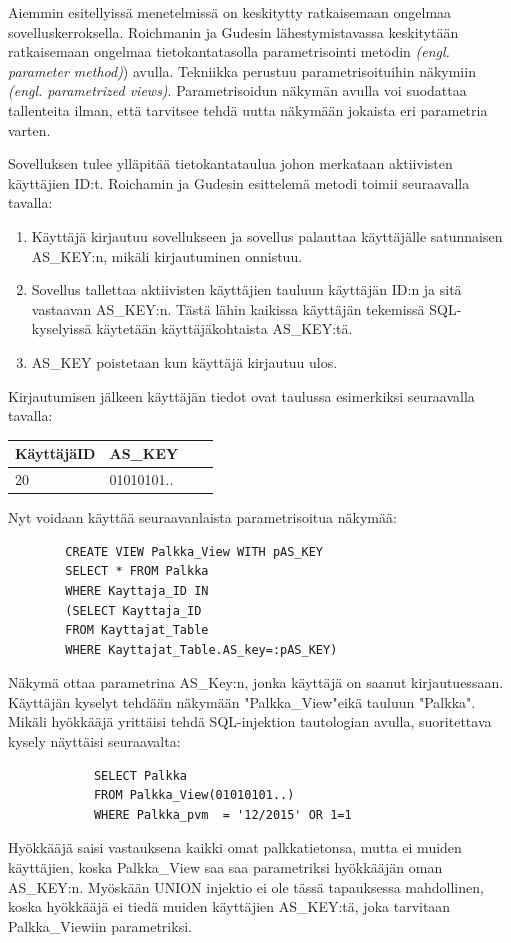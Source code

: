 \documentclass[finnish]{tktltiki2}
\theoremstyle{definition}
\theoremstyle{remark}
\begin{document}
		 
		
		Aiemmin esitellyissä menetelmissä on keskitytty ratkaisemaan ongelmaa sovelluskerroksella. Roichmanin ja Gudesin lähestymistavassa keskitytään ratkaisemaan ongelmaa tietokantatasolla parametrisointi metodin \textit{(engl. parameter method)}) avulla. Tekniikka perustuu parametrisoituihin näkymiin \textit{(engl. parametrized views)}. Parametrisoidun näkymän avulla voi suodattaa tallenteita ilman, että tarvitsee tehdä uutta näkymään jokaista eri parametria varten.
		
		Sovelluksen tulee ylläpitää tietokantataulua johon merkataan aktiivisten käyttäjien ID:t. Roichamin ja Gudesin esittelemä metodi toimii seuraavalla tavalla:
		\begin{enumerate}
			\item Käyttäjä kirjautuu sovellukseen ja sovellus palauttaa käyttäjälle satunnaisen AS\_KEY:n, mikäli kirjautuminen onnistuu.
			
			\item Sovellus tallettaa aktiivisten käyttäjien tauluun käyttäjän ID:n ja sitä vastaavan AS\_KEY:n. Tästä lähin kaikissa käyttäjän tekemissä SQL-kyselyissä käytetään käyttäjäkohtaista AS\_KEY:tä.
			
			\item AS\_KEY poistetaan kun käyttäjä kirjautuu ulos.
		\end{enumerate}
		
		Kirjautumisen jälkeen käyttäjän tiedot ovat taulussa esimerkiksi seuraavalla tavalla:
	
		\begin{center}
		\begin{tabular}{| l | l | l | l |}
			\hline
			KäyttäjäID & AS\_KEY \\ \hline
			\hline
			20 &  01010101.. \\
			\hline
		\end{tabular}
		\end{center}
	

		Nyt voidaan käyttää seuraavanlaista parametrisoitua näkymää:
		\begin{lstlisting}
		CREATE VIEW Palkka_View WITH pAS_KEY
		SELECT * FROM Palkka
		WHERE Kayttaja_ID IN
		(SELECT Kayttaja_ID
		FROM Kayttajat_Table
		WHERE Kayttajat_Table.AS_key=:pAS_KEY) 
		\end{lstlisting}
		Näkymä ottaa parametrina AS\_Key:n, jonka käyttäjä on saanut kirjautuessaan. Käyttäjän kyselyt tehdään näkymään "Palkka\_View"\space eikä tauluun "Palkka". Mikäli hyökkääjä yrittäisi tehdä SQL-injektion tautologian avulla, suoritettava kysely näyttäisi seuraavalta:
		\begin{lstlisting}
			SELECT Palkka
			FROM Palkka_View(01010101..) 
			WHERE Palkka_pvm  = '12/2015' OR 1=1
		\end{lstlisting}
		Hyökkääjä saisi vastauksena kaikki omat palkkatietonsa, mutta ei muiden käyttäjien, koska Palkka\_View saa saa parametriksi hyökkääjän oman AS\_KEY:n. Myöskään UNION injektio ei ole tässä tapauksessa mahdollinen, koska hyökkääjä ei tiedä muiden käyttäjien AS\_KEY:tä, joka tarvitaan Palkka\_Viewiin parametriksi.
	
\end{document}
